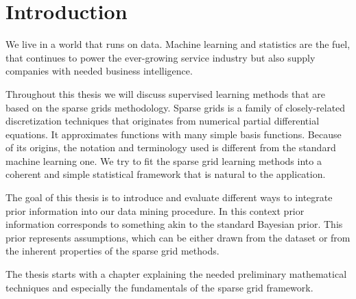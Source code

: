\chapter{Introduction}\label{chapter:introduction}
We live in a world that runs on data.
Machine learning and statistics are the fuel, that continues to power the
ever-growing service industry but also supply companies with needed business
intelligence.

Throughout this thesis we will discuss supervised learning methods that are
based on the sparse grids methodology.
Sparse grids is a family of closely-related discretization techniques that
originates from numerical partial differential equations.
It approximates functions with many simple basis functions.
Because of its origins, the notation and terminology used is different from the
standard machine learning one.
We try to fit the sparse grid learning methods into a coherent and simple
statistical framework that is natural to the application.

The goal of this thesis is to introduce and evaluate different ways to integrate
prior information into our data mining procedure.
In this context prior information corresponds to something akin to the standard
Bayesian prior.
This prior represents assumptions, which can be either drawn from the dataset or
from the inherent properties of the sparse grid methods.

The thesis starts with a chapter explaining the needed preliminary mathematical
techniques and especially the fundamentals of the sparse grid framework.

